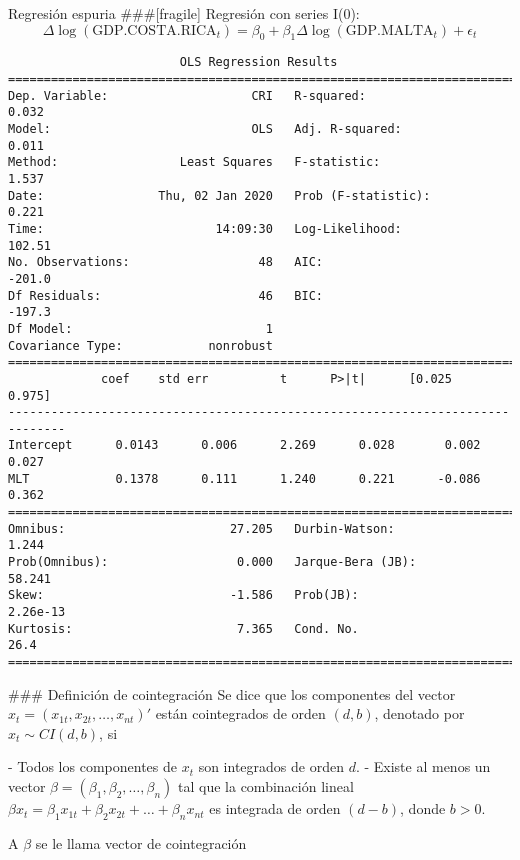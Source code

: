 \begin{EXAMPLE}{Regresión espuria}
###[fragile]
Regresión con series I(0):
\begin{equation*}
\Delta\log(\text{GDP.COSTA.RICA}_t) = \beta_0 + \beta_1\Delta\log(\text{GDP.MALTA}_t) + \epsilon_t
\end{equation*}

\begin{verbatim}
                        OLS Regression Results
==============================================================================
Dep. Variable:                    CRI   R-squared:                       0.032
Model:                            OLS   Adj. R-squared:                  0.011
Method:                 Least Squares   F-statistic:                     1.537
Date:                Thu, 02 Jan 2020   Prob (F-statistic):              0.221
Time:                        14:09:30   Log-Likelihood:                 102.51
No. Observations:                  48   AIC:                            -201.0
Df Residuals:                      46   BIC:                            -197.3
Df Model:                           1
Covariance Type:            nonrobust
==============================================================================
             coef    std err          t      P>|t|      [0.025      0.975]
------------------------------------------------------------------------------
Intercept      0.0143      0.006      2.269      0.028       0.002       0.027
MLT            0.1378      0.111      1.240      0.221      -0.086       0.362
==============================================================================
Omnibus:                       27.205   Durbin-Watson:                   1.244
Prob(Omnibus):                  0.000   Jarque-Bera (JB):               58.241
Skew:                          -1.586   Prob(JB):                     2.26e-13
Kurtosis:                       7.365   Cond. No.                         26.4
==============================================================================
\end{verbatim}

\end{EXAMPLE}



### Definición de cointegración \parencite{EngleGranger:1987}
Se dice que los componentes del vector $x_t = \left(x_{1t},x_{2t},\dots,x_{nt}\right)'$ están \alert{cointegrados} de orden $(d, b)$, denotado por $x_t\sim CI(d,b)$, si
\begin{enumerate}
- Todos los componentes de $x_t$ son integrados de orden $d$.
- Existe al menos un vector $\beta = \left(\beta_1,\beta_2,\dots,\beta_n\right)$ tal que la combinación lineal $\beta x_t = \beta_1x_{1t} + \beta_2x_{2t} + \dots +\beta_nx_{nt}$ es integrada de orden $(d-b)$, donde $b>0$.

\vspace{2em}
A $\beta$ se le llama \alert{vector de cointegración}
\end{enumerate}


